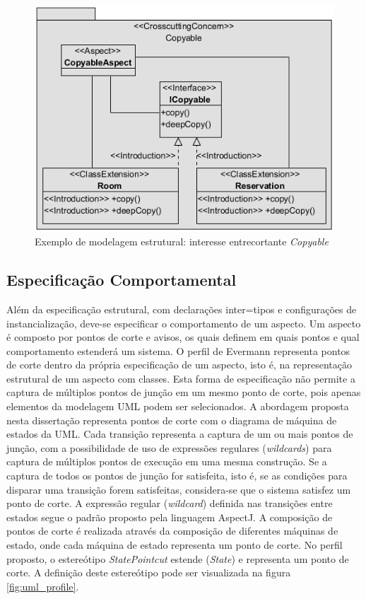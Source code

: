 \begin{figure}[!b] \centering
	\includegraphics{img/structural_profile_example.png}
	\caption{Exemplo de modelagem estrutural: interesse entrecortante \textit{Copyable}}\label{fig:structural_profile_example}
\end{figure}

\subsection{Especificação Comportamental}

Além da especificação estrutural, com declarações inter=tipos e configurações de instancialização, deve-se especificar o comportamento de um aspecto.
Um aspecto é composto por pontos de corte e avisos, os quais definem em quais pontos e qual comportamento estenderá um sistema. O perfil de Evermann 
\cite{Evermann:2007:MSP:1229375.1229379} representa pontos de corte dentro da própria especificação de um aspecto, isto é, na representação estrutural
de um aspecto com classes. Esta forma de especificação não permite a captura de múltiplos pontos de junção em um mesmo ponto de corte, pois
apenas elementos da modelagem UML podem ser selecionados. A abordagem proposta nesta dissertação representa pontos de corte com o diagrama de máquina 
de estados da UML. Cada transição representa a captura de um ou mais pontos de junção, com a possibilidade de uso de expressões regulares
(\textit{wildcards}) para captura de múltiplos pontos de execução em uma mesma construção. Se a captura de todos os pontos de junção for 
satisfeita, isto é, se as condições para disparar uma transição forem satisfeitas, considera-se que o sistema satisfez um ponto de corte. A expressão
regular (\textit{wildcard}) definida nas transições entre estados segue o padrão proposto pela linguagem AspectJ. A composição de pontos de corte é
realizada através da composição de diferentes máquinas de estado, onde cada máquina de estado representa um ponto de corte. No perfil proposto, o
estereótipo \textit{StatePointcut} estende (\textit{State}) e representa um ponto de corte. A definição deste estereótipo pode ser visualizada na figura \ref{fig:uml_profile}.


